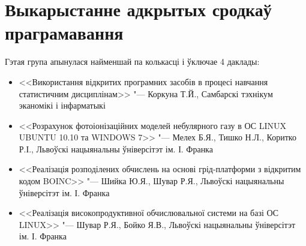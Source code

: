 \documentclass[10pt, a5paper]{article}
\begin{document}
\section*{Выкарыстанне адкрытых сродкаў праграмавання}
Гэтая група апынулася найменшай па колькасці і ўключае 4 даклады:
\begin{itemize}
\item <<Використання відкритих програмних засобів в процесі навчання статистичним дисциплінам>> "--- Коркуна Т.Й., Самбарскі тэхнікум эканомікі і інфарматыкі
\item <<Розрахунок фотоіонізаційних моделей небулярного газу в ОС LINUX UBUNTU 10.10 та WINDOWS 7>> "--- Мелех Б.Я., Тишко Н.Л., Коритко Р.І., Львоўскі нацыянальны ўніверсітэт ім. І. Франка
\item <<Реалізація розподілених обчислень на основі грід-платформи з відкритим кодом BOINC>> "--- Шийка Ю.Я., Шувар Р.Я., \linebreak Львоўскі нацыянальны ўніверсітэт ім. І. Франка
\item <<Реалізація високопродуктивної обчислювальної системи на базі ОС  LINUX>> "--- Шувар Р.Я., Бойко Я.В., Львоўскі нацыянальны ўніверсітэт ім. І. Франка
\end{itemize}
\end{document}
